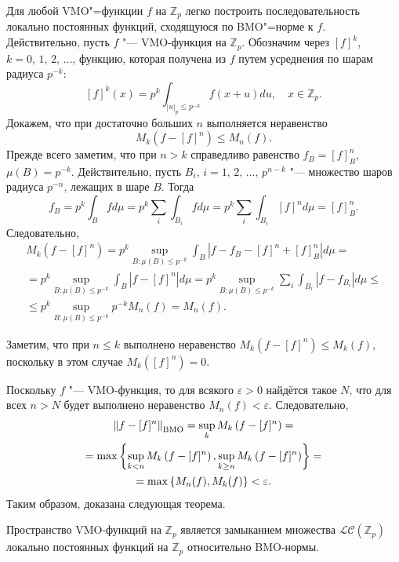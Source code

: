 Для любой VMO"=функции $f$ на $\mathbb Z_p$ легко построить
последовательность локально постоянных функций, сходящуюся по
BMO"=норме к $f$. Действительно, пусть $f$ "--- VMO-функция на
$\mathbb Z_p$. Обозначим через $[f]^k$, $k=0,\,1,\,2,\,\dots$,
функцию, которая получена из $f$ путем усреднения по шарам радиуса
$p^{-k}$:
$$
[f]^k(x) = p^k\int_{|u|_p\leq p^{-k}}f(x+u)du,\quad x\in\mathbb
Z_p.
$$
Докажем, что при достаточно больших $n$ выполняется неравенство
\begin{equation}
\label{zel:estimation} M_k \left(f-[f]^n\right)\leq M_n(f).
\end{equation}
Прежде всего заметим, что при $n>k$ справедливо равенство
$f_B=[f]^n_B$, $\mu(B)=p^{-k}$. Действительно, пусть $B_i$,
$i=1,\,2,\, \dots,\, p^{n-k}$ "--- множество шаров радиуса
$p^{-n}$, лежащих в шаре $B$. Тогда
$$
f_B=p^k\int_Bfd\mu=p^k\sum_i\int_{B_i}fd\mu=p^k\sum_i\int_{B_i}[f]^nd\mu=[f]^n_B.
$$
Следовательно,
\begin{multline*}
M_k \left(f-[f]^n\right)=p^k\sup_{B\colon\mu(B)\leq p^{-k}}\int_B\left|f-f_B-[f]^n+[f]^n_B\right|d\mu= \\
=p^k\sup_{B\colon\mu(B)\leq p^{-k}}\int_B\left|f-[f]^n\right|d\mu=p^k\sup_{B\colon\mu(B)\leq p^{-k}}\sum_i\int_{B_i}\left|f-f_{B_i}\right|d\mu \leq \\
\leq p^k\sup_{B\colon\mu(B)\leq p^{-k}}p^{-k}M_n(f) = M_n(f).
\end{multline*}

Заметим, что при $n\leq k$ выполнено неравенство $M_k
\left(f-[f]^n\right) \leq  M_k(f)$, поскольку в этом случае
$M_k\left([f]^n\right)=0$.

Поскольку $f$ "--- VMO-функция, то для всякого $\varepsilon >0$
найдётся такое $N$, что для всех $n > N$ будет выполнено
неравенство $M_n (f)<\varepsilon$. Следовательно,
\begin{multline*}
\left\|f-[f]^n\right\|_{\rm BMO}=\sup_kM_k\left(f-[f]^n\right)=\\
=\max\left\{\sup_{k<n}M_k\left(f-[f]^n\right), \sup_{k\ge n}M_k\left(f-[f]^n\right)\right\}= \\
=\max\left\{M_n(f), M_k(f)\right\}<\varepsilon.
\end{multline*}
 Таким образом, доказана следующая теорема.

\smallskip

\begin{theorem}[1]
Пространство VMO-функций на $\mathbb Z_p$ является замыканием
множества $\mathcal L\mathcal C\left(\mathbb Z_p\right)$ локально
постоянных функций на $\mathbb Z_p$ относительно BMO-нормы.
\end{theorem}


